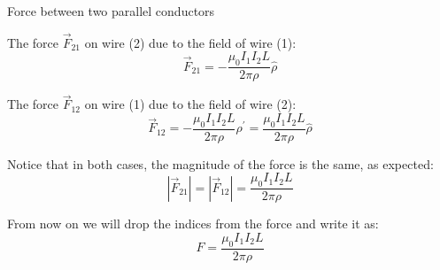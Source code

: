 \begin{frame}{Force between two parallel conductors}

The force $\vec{F}_{21}$ on wire (2) due to the field of wire (1):
\begin{equation*}
  \vec{F}_{21} = - \frac{\mu_0 I_{1} I_{2} L}{2\pi \rho} \hat{\rho}
\end{equation*}

The force $\vec{F}_{12}$ on wire (1) due to the field of wire (2):
\begin{equation*}
  \vec{F}_{12} = - \frac{\mu_0 I_{1} I_{2} L}{2\pi \rho} \hat{\rho^{\prime}} = \frac{\mu_0 I_{1} I_{2} L}{2\pi \rho} \hat{\rho}
\end{equation*}

Notice that in both cases, the magnitude of the force is the same, as expected:
\begin{equation*}
  |\vec{F}_{21}| =  |\vec{F}_{12}| = \frac{\mu_0 I_{1} I_{2} L}{2\pi \rho}
\end{equation*}

From now on we will drop the indices from the force and write it as:
\begin{equation*}
  F = \frac{\mu_0 I_{1} I_{2} L}{2\pi \rho}
\end{equation*}

\end{frame}


%
%


